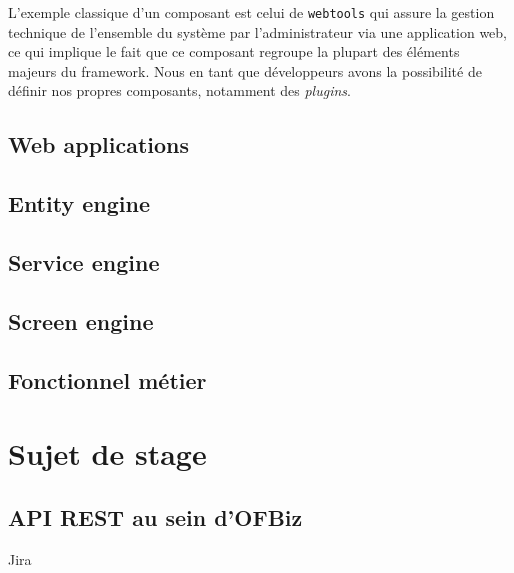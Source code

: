 L'exemple classique d'un composant est celui de \verb|webtools| qui assure la gestion technique de l'ensemble du système par l'administrateur via une application web, ce qui implique le fait que ce composant regroupe la plupart des éléments majeurs du framework.
Nous en tant que développeurs avons la possibilité de définir nos propres composants, notamment des \emph{plugins}. 
  


\subsection{Web applications}
\subsection{Entity engine}
\subsection{Service engine}
\subsection{Screen engine}
\subsection{Fonctionnel métier}

\newpage
\section{Sujet de stage }



\subsection{API REST au sein d'OFBiz}

Jira
